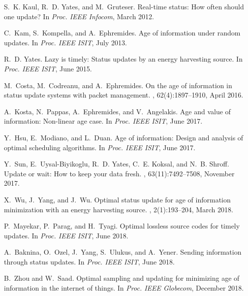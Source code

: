 \documentclass[12pt,journal,onecolumn]{IEEEtran}
\begin{document}
\begin{thebibliography}{10}

S.~K. Kaul, R.~D. Yates, and M.~Gruteser.
\newblock Real-time status: How often should one update?
\newblock In {\em Proc. IEEE Infocom}, March 2012.

C.~Kam, S.~Kompella, and A.~Ephremides.
\newblock Age of information under random updates.
\newblock In {\em Proc. IEEE ISIT}, July 2013.

R.~D. Yates.
\newblock Lazy is timely: Status updates by an energy harvesting source.
\newblock In {\em Proc. IEEE ISIT}, June 2015.

M.~Costa, M.~Codreanu, and A.~Ephremides.
\newblock On the age of information in status update systems with packet
  management.
, 62(4):1897--1910, April 2016.

A.~Kosta, N.~Pappas, A.~Ephremides, and V.~Angelakis.
\newblock Age and value of information: Non-linear age case.
\newblock In {\em Proc. IEEE ISIT}, June 2017.

Y.~Hsu, E.~Modiano, and L.~Duan.
\newblock Age of information: Design and analysis of optimal scheduling
  algorithms.
\newblock In {\em Proc. IEEE ISIT}, June 2017.

Y.~Sun, E.~Uysal-Biyikoglu, R.~D. Yates, C.~E. Koksal, and N.~B. Shroff.
\newblock Update or wait: How to keep your data fresh.
, 63(11):7492--7508, November 2017.

X.~Wu, J.~Yang, and J.~Wu.
\newblock Optimal status update for age of information minimization with an
  energy harvesting source.
, 2(1):193--204, March 2018.

P.~Mayekar, P.~Parag, and H.~Tyagi.
\newblock Optimal lossless source codes for timely updates.
\newblock In {\em Proc. IEEE ISIT}, June 2018.

A.~Baknina, O.~Ozel, J.~Yang, S.~Ulukus, and A.~Yener.
\newblock Sending information through status updates.
\newblock In {\em Proc. IEEE ISIT}, June 2018.

B.~Zhou and W.~Saad.
\newblock Optimal sampling and updating for minimizing age of information in
  the internet of things.
\newblock In {\em Proc. IEEE Globecom}, December 2018.


\end{thebibliography}
\end{document}
